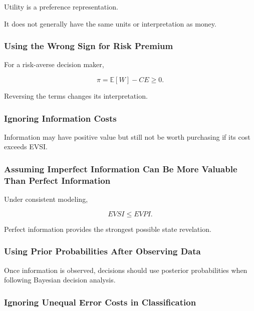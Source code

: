 Utility is a preference representation.

It does not generally have the same units or interpretation as money.

\subsubsection{Using the Wrong Sign for Risk Premium}

For a risk-averse decision maker,

\[
\boxed{
\pi
=
\mathbb{E}[W]-CE
\geq0.
}
\]

Reversing the terms changes its interpretation.

\subsubsection{Ignoring Information Costs}

Information may have positive value but still not be worth purchasing if
its cost exceeds EVSI.

\subsubsection{Assuming Imperfect Information Can Be More Valuable Than Perfect Information}

Under consistent modeling,

\[
\boxed{
EVSI
\leq
EVPI.
}
\]

Perfect information provides the strongest possible state revelation.

\subsubsection{Using Prior Probabilities After Observing Data}

Once information is observed, decisions should use posterior probabilities
when following Bayesian decision analysis.

\subsubsection{Ignoring Unequal Error Costs in Classification}

